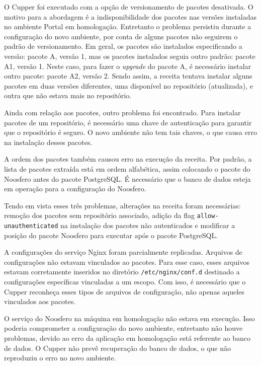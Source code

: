 O Cupper foi executado com a opção de versionamento de pacotes desativada. O motivo para
a abordagem é a indisponibilidade dos pacotes nas versões instaladas no ambiente
Portal em homologação. Entretanto o problema persistiu durante a configuração
do novo ambiente, por conta de alguns pacotes não seguirem o padrão de versionamento.
Em geral, os pacotes são instalados especificando a versão: pacote A, versão 1, mas os
pacotes instalados seguia outro padrão: pacote A1, versão 1. Neste caso,
para fazer o \textit{upgrade} do pacote A, é necessário instalar outro pacote: pacote A2,
versão 2. Sendo assim, a receita tentava instalar alguns pacotes em duas versões
diferentes, uma disponível no repositório (atualizada), e outra que não estava mais
no repositório.

Ainda com relação aos pacotes, outro problema foi encontrado. Para instalar pacotes
de um repositório, é necessário uma chave de autenticação para garantir que o repositório
é seguro. O novo ambiente não tem tais chaves, o que causa erro na instalação desses
pacotes.

A ordem dos pacotes também causou erro na execução da receita. Por padrão, a lista de
pacotes extraída está em ordem alfabética, assim colocando o pacote do Noosfero antes
do pacote PostgreSQL. É necessário que o banco de dados esteja em operação para a
configuração do Noosfero.

Tendo em vista esses três problemas, alterações na receita foram necessárias:
remoção dos pacotes sem repositório associado, adição da flag \texttt{allow-unauthenticated}
na instalação dos pacotes não autenticados e modificar a posição do pacote Noosfero
para executar após o pacote PostgreSQL.

A configurações do serviço Nginx foram parcialmente replicadas. Arquivos de configurações
não estavam vinculados ao pacotes. Para esse caso, esses arquivos estavam corretamente
inseridos no diretório \texttt{/etc/nginx/conf.d} destinado a configurações específicas
vinculadas a um escopo. Com isso, é necessário que o Cupper reconheça esses tipos
de arquivos de configuração, não apenas aqueles vinculados aos pacotes.

O serviço do Noosfero na máquina em homologação não estava em execução. Isso poderia
comprometer a configuração do novo ambiente, entretanto não houve problemas, devido
ao erro da aplicação em homologação está referente ao banco de dados. O Cupper não
prevê recuperação do banco de dados, o que não reproduziu o erro no novo ambiente.



